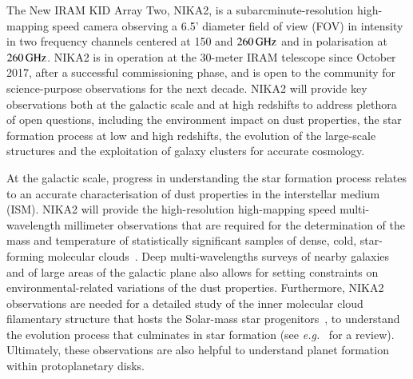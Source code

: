 The New IRAM KID Array Two, NIKA2, is a subarcminute-resolution
high-mapping speed camera observing a 6.5' diameter field of view (FOV) in intensity in two
frequency channels centered at 150 and $260\,\rm{GHz}$ and in
polarisation at $260\, \rm{GHz}$. NIKA2 is in operation at the
30-meter IRAM telescope since October 2017, after a successful
commissioning phase, and is
open to the community for science-purpose observations for the next
decade. NIKA2 will provide key observations both at the galactic scale
and at high redshifts to address plethora of open questions, including
the environment impact on dust properties, the star formation process
at low and high redshifts, the evolution of the large-scale structures
and the exploitation of galaxy clusters for accurate cosmology.
%
%

At the galactic scale, progress in understanding the star formation
process relates to an accurate characterisation of dust properties in
the interstellar medium (ISM). NIKA2 will provide the high-resolution
high-mapping speed multi-wavelength millimeter observations that are
required for the determination of the mass and temperature of
statistically significant samples of dense, cold, star-forming
molecular clouds~\citep{Rigby2018}.
Deep multi-wavelengths surveys of nearby galaxies and of large areas
of the galactic plane also allows for setting constraints on
environmental-related variations of the dust properties.
Furthermore, NIKA2 observations are needed for a
detailed study of the inner molecular cloud filamentary structure that
hosts the Solar-mass star progenitors~\citep{Bracco2017}, to
understand the evolution process that culminates in star
formation (see \emph{e.g.}~\citet{Andre2014} for a review). Ultimately, these
observations are also helpful to understand planet formation within
protoplanetary disks.

